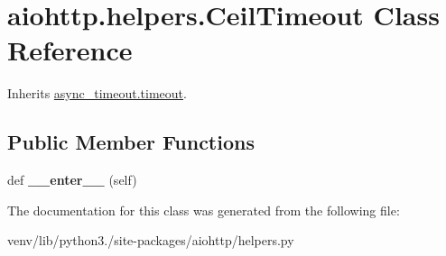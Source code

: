 \hypertarget{classaiohttp_1_1helpers_1_1_ceil_timeout}{}\section{aiohttp.\+helpers.\+Ceil\+Timeout Class Reference}
\label{classaiohttp_1_1helpers_1_1_ceil_timeout}


Inherits \hyperlink{classasync__timeout_1_1timeout}{async\+\_\+timeout.\+timeout}.

\subsection*{Public Member Functions}
\begin{DoxyCompactItemize}
\item 
\mbox{\label{classaiohttp_1_1helpers_1_1_ceil_timeout_a70cfaa1180b1c46dbf22d888c0c6a419}} 
def {\bfseries \+\_\+\+\_\+enter\+\_\+\+\_\+} (self)
\end{DoxyCompactItemize}


The documentation for this class was generated from the following file\+:\begin{DoxyCompactItemize}
\item 
venv/lib/python3./site-\/packages/aiohttp/helpers.\+py\end{DoxyCompactItemize}
